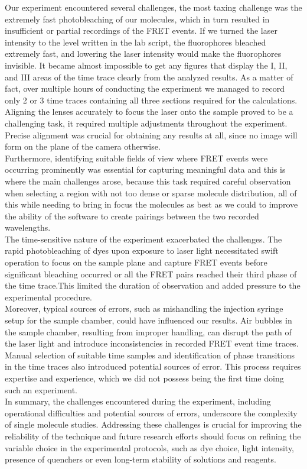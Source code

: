 \documentclass[a4paper,english,12pt,bibliography=totoc]{scrreprt}
\begin{document}
Our experiment encountered several challenges, the most taxing challenge was the extremely fast photobleaching of our molecules, which in turn resulted in insufficient or partial recordings of the FRET events.
If we turned the laser intensity to the level written in the lab script, the fluorophores bleached extremely fast, and lowering the laser intensity would make the fluorophores invisible. It became almost impossible to get any figures that display the I, II, and III areas of the time trace clearly from the analyzed results. As a matter of fact, over multiple hours of conducting the experiment we managed to record only 2 or 3 time traces containing all three sections required for the calculations.
\\
Aligning the lenses accurately to focus the laser onto the sample proved to be a challenging task, it required multiple adjustments throughout the experiment. Precise alignment was crucial for obtaining any results at all, since no image will form on the plane of the camera otherwise.
\\Furthermore, identifying suitable fields of view where FRET events were occurring prominently was essential for capturing meaningful data and this is where the main challenges arose, because this task required careful observation when selecting a region with not too dense or sparse molecule distribution, all of this while needing to bring in focus the molecules as best as we could to improve the ability of the software to create pairings between the two recorded wavelengths. 
\\
The time-sensitive nature of the experiment exacerbated the challenges. The rapid photobleaching of dyes upon exposure to laser light necessitated swift operation to focus on the sample plane and capture FRET events before significant bleaching occurred or all the FRET pairs reached their third phase of the time trace.This  limited the duration of observation and added pressure to the experimental procedure.
\\
Moreover, typical sources of errors, such as mishandling the injection syringe setup for the sample chamber, could have influenced our results. Air bubbles in the sample chamber, resulting from improper handling, can disrupt the path of the laser light and introduce inconsistencies in recorded FRET event time traces. Manual selection of suitable time samples and identification of phase transitions in the time traces also introduced potential sources of error. This process requires expertise and experience, which we did not possess being the first time doing such an experiment.
\\
In summary, the challenges encountered during the experiment, including operational difficulties and potential sources of errors, underscore the complexity of single molecule studies. Addressing these challenges is crucial for improving the reliability of the technique and future research efforts should focus on refining the variable choice in the experimental protocols, such as dye choice, light intensity, presence of quenchers or even long-term stability of solutions and reagents.
\end{document}
